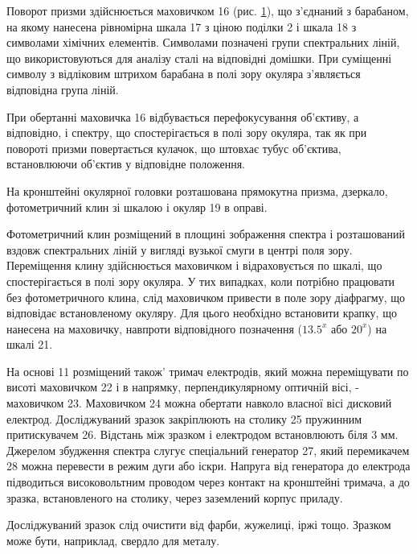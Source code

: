\documentclass[twocolumn]{el-author}
\begin{document}
\begin{figure}[h]
\caption{\source{}}
\label{img:2}
\end{figure}

Поворот призми здійснюється маховичком 16 (рис. \ref{img:2}), що з'єднаний з
барабаном, на якому нанесена рівномірна шкала 17 з ціною поділки 2 і шкала
18 з символами хімічних елементів. Символами позначені групи
спектральних ліній, що використовуються для аналізу сталі на відповідні
домішки. При суміщенні символу з відліковим штрихом барабана в полі зору
окуляра з'являється відповідна група ліній.

При обертанні маховичка 16 відбувається перефокусування об'єктиву,
а відповідно, і спектру, що спостерігається в полі зору окуляра, так як при
повороті призми повертається кулачок, що штовхає тубус об'єктива,
встановлюючи об'єктив у відповідне положення.

На кронштейні окулярної головки розташована прямокутна призма,
дзеркало, фотометричний клин зі шкалою і окуляр 19 в оправі.

Фотометричний клин розміщений в площині зображення спектра і
розташований вздовж спектральних ліній у вигляді вузької смуги в центрі
поля зору. Переміщення клину здійснюється маховичком і відраховується по
шкалі, що спостерігається в полі зору окуляра. У тих випадках, коли потрібно
працювати без фотометричного клина, слід маховичком привести в поле
зору діафрагму, що відповідає встановленому окуляру. Для цього необхідно
встановити крапку, що нанесена на маховичку, навпроти відповідного
позначення ($13.5^{x}$ або $20^{x}$) на шкалі 21.

На основі 11 розміщений також' тримач електродів, який можна
переміщувати по висоті маховичком 22 і в напрямку, перпендикулярному
оптичній вісі, - маховичком 23. Маховичком 24 можна обертати навколо
власної вісі дисковий електрод. Досліджуваний зразок закріплюють на
столику 25 пружинним притискувачем 26. Відстань між зразком і електродом
встановлюють біля 3 мм. Джерелом збудження спектра слугує спеціальний
генератор 27, який перемикачем 28 можна перевести в режим дуги або іскри.
Напруга від генератора до електрода підводиться високовольтним проводом
через контакт на кронштейні тримача, а до зразка, встановленого на столику,
через заземлений корпус приладу.

Досліджуваний зразок слід очистити від фарби, жужелиці, іржі тощо.
Зразком може бути, наприклад, свердло для металу.

\end{document}
